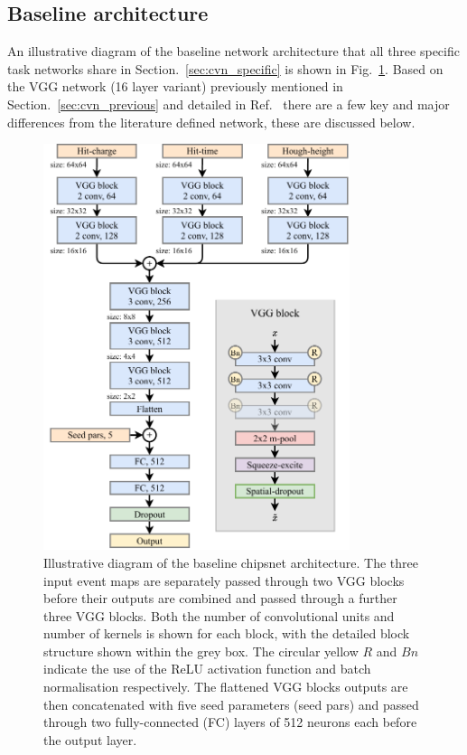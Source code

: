 \subsection{Baseline architecture} %
\label{sec:cvn_baseline_arch} %

An illustrative diagram of the baseline network architecture that all three specific task networks
share in Section.~\ref{sec:cvn_specific} is shown in Fig.~\ref{fig:chipsnet}. Based on the VGG
network (16 layer variant) previously mentioned in Section.~\ref{sec:cvn_previous} and detailed in
Ref.~\cite{simonyan2014} there are a few key and major differences from the literature defined
network, these are discussed below.

\begin{figure} %
    \includegraphics[width=0.8\textwidth]{diagrams/6-cvn/chipsnet.pdf}
    \caption[chipsnet short]
    {Illustrative diagram of the baseline chipsnet architecture. The three input event maps are
        separately passed through two VGG blocks before their outputs are combined and passed
        through a further three VGG blocks. Both the number of convolutional units and number of
        kernels is shown for each block, with the detailed block structure shown within the grey
        box. The circular yellow $R$ and $Bn$ indicate the use of the ReLU activation function and
        batch normalisation respectively. The flattened VGG blocks outputs are then concatenated
        with five seed parameters (seed pars) and passed through two fully-connected (FC) layers
        of 512 neurons each before the output layer.}
    \label{fig:chipsnet}
\end{figure}

